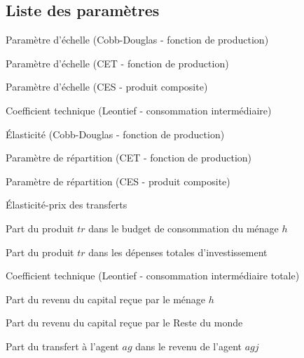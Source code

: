 \documentclass[11pt,a4paper]{article}
\newcommand{\trj}{\mathit{trj}}
\newcommand{\ag}{\mathit{ag}}
\newcommand{\agj}{\mathit{agj}}
\newcommand{\aij}{\mathit{aij}}
\newcommand{\CH}{\mathit{CH}}
\newcommand{\INV}{\mathit{INV}}
\newcommand{\io}{\mathit{io}}
\newcommand{\TR}{\mathit{TRA}}
\newcommand{\tr}{\mathit{tr}}
\begin{document}
	\subsection{Liste des paramètres}
	\begin{description}[leftmargin=!,labelwidth=\widthof{\bfseries AAAAA},parsep=10pt]
		\item[$A_{\tr}$] Paramètre d'échelle (Cobb-Douglas - \textit{}fonction de production)
		
		\item[$A_{\trj}^E$] Paramètre d'échelle (CET -  fonction de production)
		
		\item[$A_{\tr}^M$] Paramètre d'échelle (CES -  produit composite)
		
		\item[$\aij_{\tr,j}$] Coefficient technique (Leontief - consommation intermédiaire)
		
		\item[$\alpha_{\tr}$] Élasticité (Cobb-Douglas - fonction de production)
		
		\item[$\beta_{\tr}^E$] Paramètre de répartition (CET - fonction de production)		
		
		\item[$\beta_{\tr}^M$] Paramètre de répartition (CES - produit composite)
		
		\item[$\eta$]    Élasticité-prix des transferts		
		
		\item[$\gamma^{\CH}_{\tr,h}$] Part du produit $\tr$ dans le budget de consommation du ménage $h$
		
		\item[$\gamma^{\INV}_{\tr}$] Part du produit $\tr$ dans les dépenses totales d'investissement
		
		\item[$\io_{j}$] Coefficient technique (Leontief - consommation intermédiaire totale)
		
		\item[$\lambda_h$] Part du revenu du capital reçue par le ménage $h$
		
		\item[$\lambda^R$] Part du revenu du capital reçue par le Reste du monde	
		
		\item[$\lambda^{\TR}_{\ag,\agj}$] Part du transfert à l'agent $\ag$ dans le revenu de l'agent $\agj$
		

\end{description}
\end{document}
